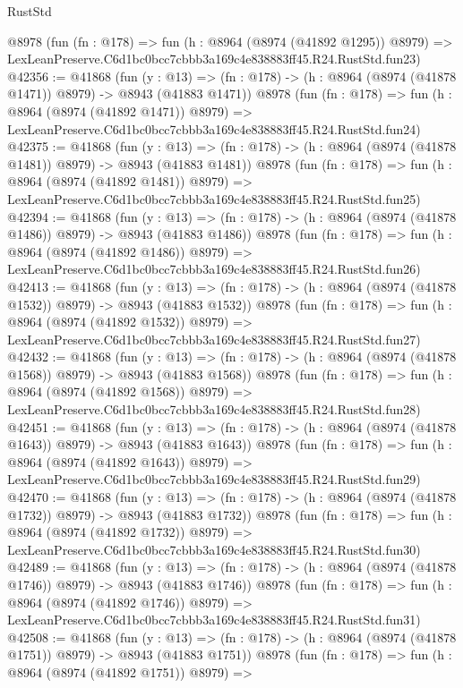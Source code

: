 \begin{lexlean}{RustStd}
\begin{coremodule}
    @8978
    (fun (fn : @178) =>
    fun (h : @8964 (@8974 (@41892 @1295)) @8979) =>
    LexLeanPreserve.C6d1bc0bcc7cbbb3a169c4e838883ff45.R24.RustStd.fun23)
@42356 := @41868
    (fun (y : @13) =>
    (fn : @178) -> (h : @8964 (@8974 (@41878 @1471)) @8979) -> @8943 (@41883 @1471))
    @8978
    (fun (fn : @178) =>
    fun (h : @8964 (@8974 (@41892 @1471)) @8979) =>
    LexLeanPreserve.C6d1bc0bcc7cbbb3a169c4e838883ff45.R24.RustStd.fun24)
@42375 := @41868
    (fun (y : @13) =>
    (fn : @178) -> (h : @8964 (@8974 (@41878 @1481)) @8979) -> @8943 (@41883 @1481))
    @8978
    (fun (fn : @178) =>
    fun (h : @8964 (@8974 (@41892 @1481)) @8979) =>
    LexLeanPreserve.C6d1bc0bcc7cbbb3a169c4e838883ff45.R24.RustStd.fun25)
@42394 := @41868
    (fun (y : @13) =>
    (fn : @178) -> (h : @8964 (@8974 (@41878 @1486)) @8979) -> @8943 (@41883 @1486))
    @8978
    (fun (fn : @178) =>
    fun (h : @8964 (@8974 (@41892 @1486)) @8979) =>
    LexLeanPreserve.C6d1bc0bcc7cbbb3a169c4e838883ff45.R24.RustStd.fun26)
@42413 := @41868
    (fun (y : @13) =>
    (fn : @178) -> (h : @8964 (@8974 (@41878 @1532)) @8979) -> @8943 (@41883 @1532))
    @8978
    (fun (fn : @178) =>
    fun (h : @8964 (@8974 (@41892 @1532)) @8979) =>
    LexLeanPreserve.C6d1bc0bcc7cbbb3a169c4e838883ff45.R24.RustStd.fun27)
@42432 := @41868
    (fun (y : @13) =>
    (fn : @178) -> (h : @8964 (@8974 (@41878 @1568)) @8979) -> @8943 (@41883 @1568))
    @8978
    (fun (fn : @178) =>
    fun (h : @8964 (@8974 (@41892 @1568)) @8979) =>
    LexLeanPreserve.C6d1bc0bcc7cbbb3a169c4e838883ff45.R24.RustStd.fun28)
@42451 := @41868
    (fun (y : @13) =>
    (fn : @178) -> (h : @8964 (@8974 (@41878 @1643)) @8979) -> @8943 (@41883 @1643))
    @8978
    (fun (fn : @178) =>
    fun (h : @8964 (@8974 (@41892 @1643)) @8979) =>
    LexLeanPreserve.C6d1bc0bcc7cbbb3a169c4e838883ff45.R24.RustStd.fun29)
@42470 := @41868
    (fun (y : @13) =>
    (fn : @178) -> (h : @8964 (@8974 (@41878 @1732)) @8979) -> @8943 (@41883 @1732))
    @8978
    (fun (fn : @178) =>
    fun (h : @8964 (@8974 (@41892 @1732)) @8979) =>
    LexLeanPreserve.C6d1bc0bcc7cbbb3a169c4e838883ff45.R24.RustStd.fun30)
@42489 := @41868
    (fun (y : @13) =>
    (fn : @178) -> (h : @8964 (@8974 (@41878 @1746)) @8979) -> @8943 (@41883 @1746))
    @8978
    (fun (fn : @178) =>
    fun (h : @8964 (@8974 (@41892 @1746)) @8979) =>
    LexLeanPreserve.C6d1bc0bcc7cbbb3a169c4e838883ff45.R24.RustStd.fun31)
@42508 := @41868
    (fun (y : @13) =>
    (fn : @178) -> (h : @8964 (@8974 (@41878 @1751)) @8979) -> @8943 (@41883 @1751))
    @8978
    (fun (fn : @178) =>
    fun (h : @8964 (@8974 (@41892 @1751)) @8979) =>

\end{coremodule}
\end{lexlean}
